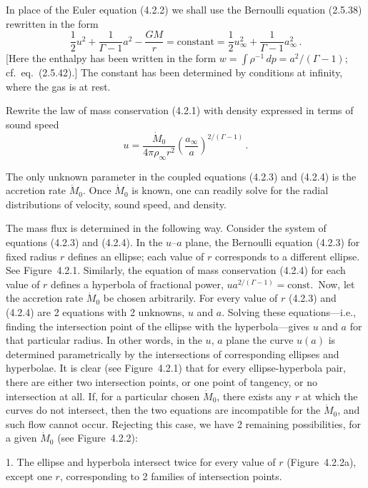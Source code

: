 In place of the Euler equation (4.2.2) we shall use the Bernoulli equation
(2.5.38) rewritten in the form
%
\begin{equation}
\frac{1}{2} u^2 + \frac{1}{\Gamma - 1} a^2 - \frac{GM}{r} = \text{constant} = \frac{1}{2} u_\infty^2 + \frac{1}{\Gamma - 1} a_\infty^2\,.
\tag{4.2.3}
\end{equation}
%
[Here the enthalpy has been written in the form $w = \int \rho^{-1}\,dp = a^2/(\Gamma - 1)$;
cf.\ eq.\ (2.5.42).] The constant has been determined by conditions at infinity,
where the gas is at rest.

Rewrite the law of mass conservation (4.2.1) with density expressed in terms
of sound speed
%
\begin{equation}
u = \frac{\dot{M}_0}{4\pi \rho_\infty r^2} \left(\frac{a_\infty}{a}\right)^{2/(\Gamma-1)}\,.
\tag{4.2.4}
\end{equation}

The only unknown parameter in the coupled equations (4.2.3) and (4.2.4) is
the accretion rate $\dot{M}_0$. Once $\dot{M}_0$ is known, one can readily solve for the radial
distributions of velocity, sound speed, and density.

The mass flux is determined in the following way. Consider the system of
equations (4.2.3) and (4.2.4). In the $u$--$a$ plane, the Bernoulli equation (4.2.3)
for fixed radius $r$ defines an ellipse; each value of $r$ corresponds to a different ellipse.
See Figure~4.2.1. Similarly, the equation of mass conservation (4.2.4) for each
value of $r$ defines a hyperbola of fractional power, $ua^{2/(\Gamma-1)} = \text{const.}$\ Now, let
the accretion rate $\dot{M}_0$ be chosen arbitrarily. For every value of $r$ (4.2.3) and
(4.2.4) are 2 equations with 2 unknowns, $u$ and $a$. Solving these equations---i.e.,
finding the intersection point of the ellipse with the hyperbola---gives $u$ and $a$
for that particular radius. In other words, in the $u$, $a$ plane the curve $u(a)$ is
determined parametrically by the intersections of corresponding ellipses and
hyperbolae. It is clear (see Figure~4.2.1) that for every ellipse-hyperbola pair,
there are either two intersection points, or one point of tangency, or no
intersection at all. If, for a particular chosen $\dot{M}_0$, there exists any $r$ at which the
curves do not intersect, then the two equations are incompatible for the $\dot{M}_0$, and
such flow cannot occur. Rejecting this case, we have 2 remaining possibilities, for
a given $\dot{M}_0$ (see Figure~4.2.2):

1. The ellipse and hyperbola intersect twice for every value of $r$ (Figure~4.2.2a),
except one $r$, corresponding to 2 families of intersection points.

